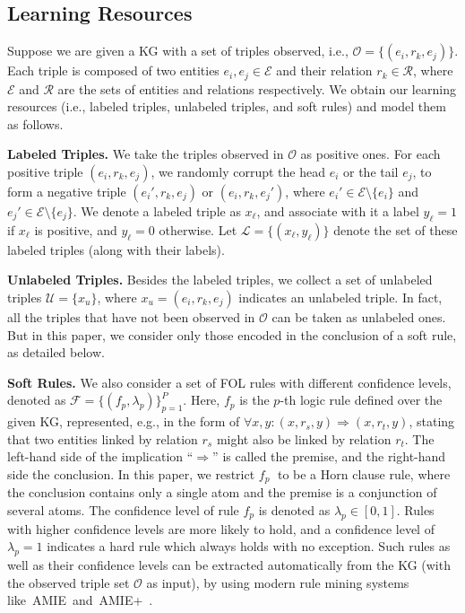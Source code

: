 \documentclass[letterpaper]{article} \usepackage{aaai18}  \usepackage{times}  \usepackage{helvet}  \usepackage{courier}  \usepackage{url}  \usepackage{graphicx}  \usepackage{amsmath}
\begin{document}
\subsection{Learning Resources}
Suppose we are given a KG with a set of triples observed, i.e., $\mathcal{O} = \{ (e_i, r_k, e_j) \}$. Each triple is composed of two entities $e_i, e_j \in \mathcal{E}$ and their relation $r_k \in \mathcal{R}$, where $\mathcal{E}$ and $\mathcal{R}$ are the sets of entities and relations respectively. We obtain our learning resources (i.e., labeled triples, unlabeled triples, and soft rules) and model them as follows.

\smallskip
\noindent\textbf{Labeled Triples.} We take the triples observed in $\mathcal{O}$ as positive ones. For each positive triple $(e_i, r_k, e_j)$, we randomly corrupt the head $e_i$ or the tail $e_j$, to form a negative triple $(e_i', r_k, e_j)$ or $(e_i, r_k, e_j')$, where $e_i'\in\mathcal{E}\setminus\{e_i\}$ and $e_j'\in\mathcal{E}\setminus\{e_j\}$. We denote a labeled triple as $x_\ell$, and associate with it a label $y_\ell=1$ if $x_\ell$ is positive, and $y_\ell=0$ otherwise. Let $\mathcal{L}=\{(x_\ell, y_\ell)\}$ denote the set of these labeled triples (along with their labels).

\smallskip
\noindent\textbf{Unlabeled Triples.} Besides the labeled triples, we collect a set of unlabeled triples $\mathcal{U}=\{x_u\}$, where $x_u=(e_i,r_k,e_j)$ indicates an unlabeled triple. In fact, all the triples that have not been observed in $\mathcal{O}$ can be taken as unlabeled ones. But in this paper, we consider only those encoded in the conclusion of a soft rule, as detailed below.

\smallskip
\noindent\textbf{Soft Rules.} We also consider a set of FOL rules with different confidence levels, denoted as $\mathcal{F}=\{(f_p,\lambda_p)\}_{p=1}^{P}$. Here, $f_p$ is the $p$-th logic rule defined over the given KG, represented, e.g., in the form of $\forall x, y: (x, r_s, y) \Rightarrow (x, r_t, y)$, stating that two entities linked by relation $r_s$ might also be linked by relation $r_t$. The left-hand side of the implication ``$\Rightarrow$'' is called the premise, and the right-hand side the conclusion. In this paper, we restrict $f_p\;$ to be a Horn clause rule, where the conclusion contains only a single atom and the premise is a conjunction of several atoms. The confidence level of rule $f_p$ is denoted as $\lambda_p \in [0,1]$. Rules with higher confidence levels are more likely to hold, and a confidence level of $\lambda_p=1$ indicates a hard rule which always holds with no exception. Such rules as well as their confidence levels can be extracted automatically from the KG (with the observed triple set $\mathcal{O}$ as input), by using modern rule mining systems \mbox{like AMIE and AMIE+~\cite{galarraga2013:AMIE,galarraga2015:AMIE+}.}
\end{document}
